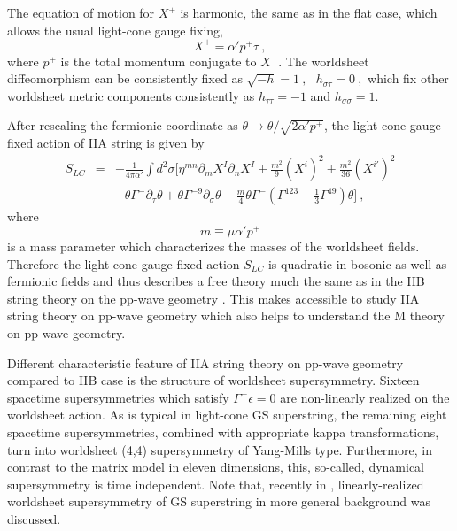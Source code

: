 \documentclass[a4paper,12pt]{article}
\begin{document}
The equation of motion for $X^+$ is harmonic, the same as in the flat
case, which allows the usual light-cone gauge fixing,
\begin{equation}
X^+ = \alpha' p^+  \tau~,
\end{equation} 
where $p^+$ is the total momentum conjugate to $X^-$. The worldsheet
diffeomorphism can be consistently fixed as $\sqrt{-h} = 1 ~, \ \ \
h_{\sigma \tau} = 0 ~, $ which fix other worldsheet metric components
consistently as $h_{\tau \tau} = -1$ and $ h_{\sigma \sigma} = 1 $.
 
After rescaling the fermionic coordinate as $\theta \rightarrow
\theta / \sqrt{2 \alpha' p^+}$, the light-cone gauge fixed 
action of IIA string is 
given by
\begin{eqnarray}
S_{LC} 
 &=& - \frac{1}{4 \pi \alpha'} \int  d^2 \sigma
 \Bigg[ \eta^{mn} \partial_m X^I \partial_n X^I 
      + \frac{m^2}{9} (X^i)^2
      + \frac{m^2}{36} (X^{i'})^2
                       \nonumber \\
 & & + \bar{\theta} \Gamma^- \partial_\tau \theta 
     + \bar{\theta} \Gamma^{-9} \partial_\sigma \theta 
     - \frac{m}{4} \bar{\theta} \Gamma^- 
        \left( \Gamma^{123} + \frac{1}{3} \Gamma^{49} \right)
        \theta  
  \Bigg] ~,
\end{eqnarray}
where 
\begin{equation}
m\equiv \mu \alpha' p^+
\end{equation}
is a mass parameter which characterizes the masses of the worldsheet
fields.  Therefore the light-cone gauge-fixed action $S_{LC}$ is
quadratic in bosonic as well as fermionic fields and thus describes a
free theory much the same as in the IIB string theory \cite{met044} on
the pp-wave geometry \cite{bla242}. This makes accessible to study IIA
string theory on pp-wave geometry which also helps to understand the M
theory on pp-wave geometry.

Different characteristic feature of IIA string theory on pp-wave
geometry compared to IIB case is the structure of worldsheet
supersymmetry.  Sixteen spacetime supersymmetries which satisfy
$\Gamma^+ \epsilon = 0$ are non-linearly realized on the worldsheet
action.  As is typical in light-cone GS superstring, the remaining
eight spacetime supersymmetries, combined with appropriate kappa
transformations, turn into worldsheet (4,4) supersymmetry of
Yang-Mills type\cite{hyu074}.  Furthermore, in contrast to the matrix
model in eleven dimensions, this, so-called, dynamical supersymmetry
is time independent. Note that, recently in \cite{cve193},
linearly-realized worldsheet supersymmetry of GS superstring in more
general background was discussed.
\end{document}
